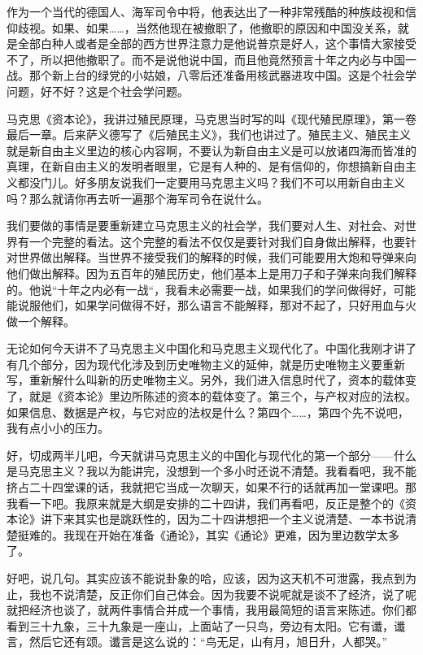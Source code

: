\documentclass[UTF8, 12pt, a4paper]{ctexrep}
\begin{document}
作为一个当代的德国人、海军司令中将，他表达出了一种非常残酷的种族歧视和信仰歧视。如果、如果……，当然他现在被撤职了，他撤职的原因和中国没关系，就是全部白种人或者是全部的西方世界注意力是他说普京是好人，这个事情大家接受不了，所以把他撤职了。而不是说他说中国，而且他竟然预言十年之内必与中国一战。那个新上台的绿党的小姑娘，八零后还准备用核武器进攻中国。这是个社会学问题，好不好？这是个社会学问题。

马克思《资本论》，我讲过殖民原理，马克思当时写的叫《现代殖民原理》，第一卷最后一章。后来萨义德写了《后殖民主义》，我们也讲过了。殖民主义、殖民主义就是新自由主义里边的核心内容啊，不要认为新自由主义是可以放诸四海而皆准的真理，在新自由主义的发明者眼里，它是有人种的、是有信仰的，你想搞新自由主义都没门儿。好多朋友说我们一定要用马克思主义吗？我们不可以用新自由主义吗？那么就请你再去听一遍那个海军司令在说什么。

我们要做的事情是要重新建立马克思主义的社会学，我们要对人生、对社会、对世界有一个完整的看法。这个完整的看法不仅仅是要针对我们自身做出解释，也要针对世界做出解释。当世界不接受我们的解释的时候，我们可能要用大炮和导弹来向他们做出解释。因为五百年的殖民历史，他们基本上是用刀子和子弹来向我们解释的。他说“十年之内必有一战“，我看未必需要一战，如果我们的学问做得好，可能能说服他们，如果学问做得不好，那么语言不能解释，那对不起了，只好用血与火做一个解释。

无论如何今天讲不了马克思主义中国化和马克思主义现代化了。中国化我刚才讲了有几个部分，因为现代化涉及到历史唯物主义的延伸，就是历史唯物主义要重新写，重新解什么叫新的历史唯物主义。另外，我们进入信息时代了，资本的载体变了，就是《资本论》里边所陈述的资本的载体变了。第三个，与产权对应的法权。如果信息、数据是产权，与它对应的法权是什么？第四个……，第四个先不说吧，我有点小小的压力。

好，切成两半儿吧，今天就讲马克思主义的中国化与现代化的第一个部分——什么是马克思主义？我以为能讲完，没想到一个多小时还说不清楚。我看看吧，我不能挤占二十四堂课的话，我就把它当成一次聊天，如果不行的话就再加一堂课吧。那我看一下吧。我原来就是大纲是安排的二十四讲，我们再看吧，反正是整个的《资本论》讲下来其实也是跳跃性的，因为二十四讲想把一个主义说清楚、一本书说清楚挺难的。我现在开始在准备《通论》，其实《通论》更难，因为里边数学太多了。

好吧，说几句。其实应该不能说卦象的哈，应该，因为这天机不可泄露，我点到为止，我也不说清楚，反正你们自己体会。因为我要不说呢就是谈不了经济，说了呢就把经济也谈了，就两件事情合并成一个事情，我用最简短的语言来陈述。你们都看到三十九象，三十九象是一座山，上面站了一只鸟，旁边有太阳。它有谶，谶言，然后它还有颂。谶言是这么说的：“鸟无足，山有月，旭日升，人都哭。”
\end{document}

